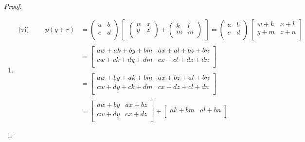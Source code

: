 \documentclass[11pt,a4paper]{article}
\theoremstyle{definition}
\begin{document}
\begin{proof}
\begin{enumerate}
\begin{enumerate}
     \item[]\begin{align*}
 \text{(vi)}\hspace{1cm}    p (q + r) & = \begin{pmatrix}
     a & b\\
     c & d\\
     \end{pmatrix}\, \begin{bmatrix}
     \begin{pmatrix}
     w & x\\
     y & z\\
     \end{pmatrix} + \begin{pmatrix}
     k & l\\
     m & m\\
     \end{pmatrix}
     \end{bmatrix} 
      = \begin{pmatrix}
     a & b\\
     c & d\\
     \end{pmatrix}\, \begin{bmatrix}
     w + k & x + l\\
     y + m & z + n\\
     \end{bmatrix}\\\\
     & = \begin{bmatrix}
     aw + ak + by + bm & ax + al + bz + bn\\
     cw + ck + dy + dm & cx + cl + dz + dn\\
     \end{bmatrix}\\\\ 
     & = \begin{bmatrix}
     aw + by + ak + bm & ax + bz + al + bn\\
     cw + dy + ck + dm & cx + dz + cl + dn\\
     \end{bmatrix}\\\\
     & = \begin{bmatrix}
     aw + by & ax + bz\\
     cw + dy & cx + dz\\
     \end{bmatrix} + \begin{bmatrix}
     ak + bm & al + bn\\

\end{bmatrix}
\end{align*}
\end{enumerate}
\end{enumerate}
\end{proof}
\end{document}
